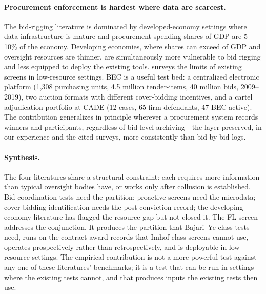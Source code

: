 \paragraph{Procurement enforcement is hardest where data are
scarcest.} The bid-rigging literature is dominated by
developed-economy settings where data infrastructure is mature
and procurement spending shares of GDP are 5--10\% of the
economy. Developing economies, where shares can exceed \valPctTwelve of
GDP \citep{oecd2019government} and oversight resources are
thinner, are simultaneously more vulnerable to bid rigging and
less equipped to deploy the existing tools.
\citet{sanchezgraells2019screening} surveys the limits of
existing screens in low-resource settings. BEC is a useful test
bed: a centralized electronic platform (1,308 purchasing
units, 4.5 million tender-items, 40 million bids, 2009--2019),
two auction formats with different cover-bidding incentives,
and a cartel adjudication portfolio at CADE (12 cases, 65
firm-defendants, 47 BEC-active). The contribution generalizes
in principle wherever a procurement system records winners and
participants, regardless of bid-level archiving---the layer
preserved, in our experience and the cited surveys, more
consistently than bid-by-bid logs.

\paragraph{Synthesis.} The four literatures share a structural
constraint: each requires more information than typical
oversight bodies have, or works only after collusion is
established. Bid-coordination tests need the partition;
proactive screens need the microdata; cover-bidding
identification needs the post-conviction record; the developing-economy
literature has flagged the resource gap but not closed it.
The FL screen addresses the conjunction. It produces the
partition that Bajari--Ye-class tests need, runs on the
contract-award records that Imhof-class screens cannot use,
operates prospectively rather than retrospectively, and is
deployable in low-resource settings. The empirical contribution
is not a more powerful test against any one of these
literatures' benchmarks; it is a test that can be run in
settings where the existing tests cannot, and that produces
inputs the existing tests then use.
